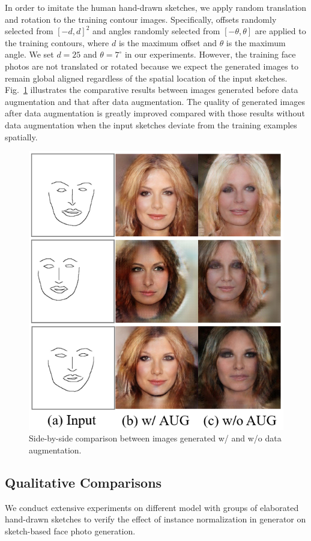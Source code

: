 \documentclass[10pt,twocolumn,letterpaper]{article}
\begin{document}
In order to imitate the human hand-drawn sketches, we apply random translation and rotation to the training contour images. 
Specifically, offsets randomly selected from $[-d,d]^2$ and angles randomly selected from $[-\theta,\theta]$ are applied to the training contours, where $d$ is the maximum offset and $\theta$ is the maximum angle.
We set $d=25$ and $\theta=7^\circ$ in our experiments. 
However, the training face photos are not translated or rotated because we expect the generated images to remain global aligned regardless of the spatial location of the input sketches.
Fig.~\ref{fig:data_augmentation} illustrates the comparative results between images generated before data augmentation and that after data augmentation. 
The quality of generated images after data augmentation is greatly improved compared with those results without data augmentation when the input sketches deviate from the training examples spatially.

\begin{figure}[htb]
	\centering
	\includegraphics[width=0.35 \textwidth]{data_augmentation.png}
	\caption{Side-by-side comparison between images generated w/ and w/o data augmentation. }
	\label{fig:data_augmentation}
\end{figure}


\subsection{Qualitative Comparisons}\label{sec:results}
We conduct extensive experiments on different model with groups of elaborated hand-drawn sketches to verify the effect of instance normalization in generator on sketch-based face photo generation.
  
\end{document}
